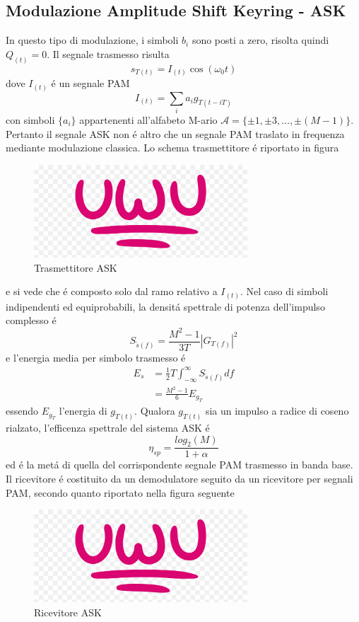     \subsection{Modulazione Amplitude Shift Keyring - ASK}
        In questo tipo di modulazione, i simboli $b_i$ sono posti a zero, risolta quindi $Q_{(t)} = 0$. 
        Il segnale trasmesso risulta 
        \[
            s_{T(t)} = I_{(t)}\cos(\omega_0 t)
        \]
        dove $I_{(t)}$ é un segnale PAM
        \[
            I_{(t)} = \sum_{i}a_ig_{T(t-iT)}    
        \]
        con simboli $\{a_i\}$ appartenenti all'alfabeto M-ario $\mathcal{A} = \{\pm 1, \pm 3,\dots,\pm (M-1)\}$. Pertanto 
        il segnale ASK non é altro che un segnale PAM traslato in frequenza mediante modulazione classica. Lo schema trasmettitore 
        é riportato in figura 
        \begin{figure}[H]
            \centering
            \includegraphics*[width = 8cm]{media/uwu.png}
            \caption{Trasmettitore ASK}
        \end{figure}        
        e si vede che é composto solo dal ramo relativo a $I_{(t)}$. Nel caso di simboli indipendenti ed equiprobabili, la densitá 
        spettrale di potenza dell'impulso complesso é 
        \[
            S_{\tilde{s}(f)} = \frac{M^2-1}{3T}\left|G_{T(f)}\right|^2
        \]
        e l'energia media per simbolo trasmesso é 
        \begin{align}
            E_s &= \frac{1}{2}T\int_{-\infty}^{\infty}S_{\tilde{s}(f)}df\nonumber \\
                &= \frac{M^2-1}{6}E_{g_T}\nonumber
        \end{align}
        essendo $E_{g_T}$ l'energia di $g_{T(t)}$. Qualora $g_{T(t)}$ sia un impulso a radice di coseno rialzato, l'efficenza spettrale
        del sistema ASK é 
        \[
            \eta_{sp} = \frac{log_2(M)}{1+\alpha}    
        \]
        ed é la metá di quella del corrispondente segnale PAM trasmesso in banda base. Il ricevitore é costituito da un demodulatore seguito da 
        un ricevitore per segnali PAM, secondo quanto riportato nella figura seguente
        \begin{figure}[H]
            \centering
            \includegraphics*[width = 8cm]{media/uwu.png}
            \caption{Ricevitore ASK}
        \end{figure}
